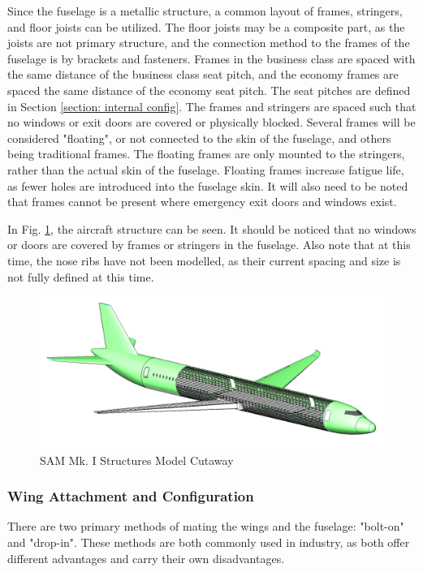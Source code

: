 Since the fuselage is a metallic structure, a common layout of frames, stringers, and floor joists can be utilized. The floor joists may be a composite part, as the joists are not primary structure, and the connection method to the frames of the fuselage is by brackets and fasteners. Frames in the business class are spaced with the same distance of the business class seat pitch, and the economy frames are spaced the same distance of the economy seat pitch. The seat pitches are defined in Section \ref{section: internal config}. The frames and stringers are spaced such that no windows or exit doors are covered or physically blocked. Several frames will be considered "floating", or not connected to the skin of the fuselage, and others being traditional frames. The floating frames are only mounted to the stringers, rather than the actual skin of the fuselage. Floating frames increase fatigue life, as fewer holes are introduced into the fuselage skin. It will also need to be noted that frames cannot be present where emergency exit doors and windows exist.

In Fig. \ref{fig:structure_cutaway}, the aircraft structure can be seen. It should be noticed that no windows or doors are covered by frames or stringers in the fuselage. Also note that at this time, the nose ribs have not been modelled, as their current spacing and size is not fully defined at this time.

\begin{figure}[!h]
    \centering
    \includegraphics[width=\linewidth]{Photos/structuresandloads/Updated Sctructures Cutaway.PNG}
    \caption{SAM Mk. I Structures Model Cutaway}
    \label{fig:structure_cutaway}
\end{figure}

\subsubsection{Wing Attachment and Configuration}
There are two primary methods of mating the wings and the fuselage: "bolt-on" and "drop-in". These methods are both commonly used in industry, as both offer different advantages and carry their own disadvantages. 

